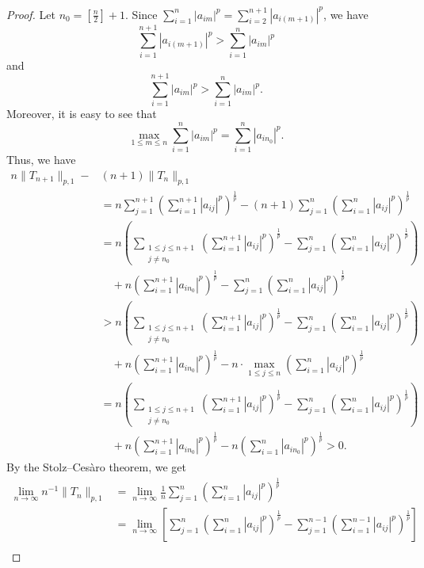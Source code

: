\documentclass{amsart}
\begin{document}
\begin{proof}
    Let $n_0=\left[\frac{n}{2}\right]+1$. Since $\sum_{i=1}^{n}|a_{im}|^p=\sum_{i=2}^{n+1}|a_{i(m+1)}|^p$, we have
    $$\sum_{i=1}^{n+1}|a_{i(m+1)}|^p>\sum_{i=1}^{n}|a_{im}|^p$$
    and 
       $$\sum_{i=1}^{n+1}|a_{im}|^p>\sum_{i=1}^{n}|a_{im}|^p.$$
       Moreover, it is easy to see that
       $$\max_{1\leq m\leq n}\sum_{i=1}^{n}|a_{im}|^p=\sum_{i=1}^{n}|a_{in_0}|^p.$$
    Thus, we have
    \begin{align*}
        n\|T_{n+1}\|_{p,1}-&(n+1)\|T_{n}\|_{p,1}\\&=n\sum_{j=1}^{n+1}\left(\sum_{i=1}^{n+1}|a_{ij}|^p\right)^\frac{1}{p}-(n+1)\sum_{j=1}^{n}\left(\sum_{i=1}^{n}|a_{ij}|^p\right)^\frac{1}{p}\\
        &=n\left(\sum_{\substack{1\leq j\leq n+1\\j\neq n_0}}\left(\sum_{i=1}^{n+1}|a_{ij}|^p\right)^\frac{1}{p}-\sum_{j=1}^{n}\left(\sum_{i=1}^{n}|a_{ij}|^p\right)^\frac{1}{p}\right)\\
        &\quad+n\left(\sum_{i=1}^{n+1}|a_{in_0}|^p\right)^\frac{1}{p}-\sum_{j=1}^{n}\left(\sum_{i=1}^{n}|a_{ij}|^p\right)^\frac{1}{p}\\
        &>n\left(\sum_{\substack{1\leq j\leq n+1\\j\neq n_0}}\left(\sum_{i=1}^{n+1}|a_{ij}|^p\right)^\frac{1}{p}-\sum_{j=1}^{n}\left(\sum_{i=1}^{n}|a_{ij}|^p\right)^\frac{1}{p}\right)\\
        &\quad+n\left(\sum_{i=1}^{n+1}|a_{in_0}|^p\right)^\frac{1}{p}-n\cdot\max_{1\leq j\leq n}\left(\sum_{i=1}^{n}|a_{ij}|^p\right)^\frac{1}{p}\\
        &=n\left(\sum_{\substack{1\leq j\leq n+1\\j\neq n_0}}\left(\sum_{i=1}^{n+1}|a_{ij}|^p\right)^\frac{1}{p}-\sum_{j=1}^{n}\left(\sum_{i=1}^{n}|a_{ij}|^p\right)^\frac{1}{p}\right)\\
        &\quad+n\left(\sum_{i=1}^{n+1}|a_{in_0}|^p\right)^\frac{1}{p}-n\left(\sum_{i=1}^{n}|a_{in_0}|^p\right)^\frac{1}{p}>0.
    \end{align*}
By the Stolz--Ces\`aro theorem, we get
    \begin{align*}
        \lim_{n\to \infty}n^{-1}\|T_n\|_{p,1}&=\lim_{n\to \infty}\frac{1}{n}\sum_{j=1}^{n}\left(\sum_{i=1}^{n}|a_{ij}|^p\right)^\frac{1}{p}\\
        &=\lim_{n\to \infty}\left[\sum_{j=1}^{n}\left(\sum_{i=1}^{n}|a_{ij}|^p\right)^\frac{1}{p}-\sum_{j=1}^{n-1}\left(\sum_{i=1}^{n-1}|a_{ij}|^p\right)^\frac{1}{p}\right]\\

\end{align*}
\end{proof}
\end{document}
